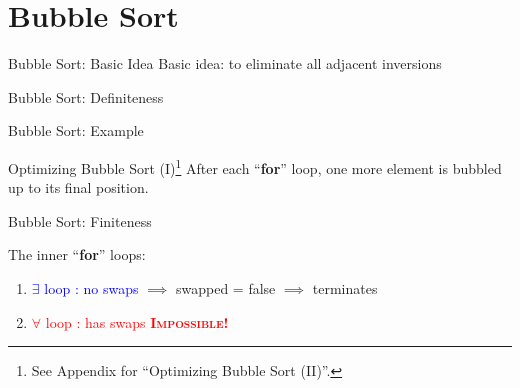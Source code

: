 \section{Bubble Sort}

\begin{frame}{Bubble Sort: Basic Idea}
  Basic idea: to eliminate all adjacent inversions
  \pause

  

  \vspace{0.30cm}
\end{frame}
\begin{frame}{Bubble Sort: Definiteness}
  
\end{frame}
\begin{frame}{Bubble Sort: Example}

  \begin{center}
	
  \end{center}

\end{frame}
\begin{frame}{Optimizing Bubble Sort (I)\footnote{See Appendix for ``Optimizing Bubble Sort (II)''.}}
  After each ``{\bf for}'' loop, one more element is bubbled up to its final position.

  
\end{frame}
\begin{frame}{Bubble Sort: Finiteness}
  \begin{center}
  \end{center}

  The inner ``{\bf for}'' loops:
  \begin{enumerate}[1)]
	\item \textcolor{blue}{$\exists$ loop : no swaps} $\implies$ swapped = false $\implies$ terminates
	  \pause
	\item \textcolor{red}{$\forall$ loop : has swaps} \pause \qquad \textcolor{red}{\bf \textsc{Impossible}!}
  \end{enumerate}
\end{frame}

